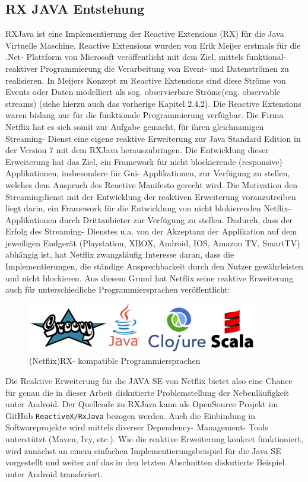 \documentclass[12pt,oneside,a4paper,bibtotoc,liststotoc]{scrreprt}
\begin{document}
\subsection{RX JAVA Entstehung}
RXJava ist eine Implementierung der Reactive Extensions (RX) für die Java Virtuelle Maschine. Reactive Extensions wurden von Erik Meijer erstmals für die .Net- Plattform von Microsoft veröffentlicht mit dem Ziel, mittels funktional-reaktiver Programmierung die Verarbeitung von Event- und Datenströmen zu realisieren. In Meijers Konzept zu Reactive Extensions sind diese Ströme von Events oder Daten modelliert als sog. \glqq observierbare Ströme\grqq (eng. observable streams) (siehe hierzu auch das vorherige Kapitel 2.4.2). Die Reactive Extensions waren bislang nur für die funktionale Programmierung verfügbar. Die Firma Netflix hat es sich somit zur Aufgabe gemacht, für ihren gleichnamigen Streaming- Dienst eine eigene reaktive Erweiterung zur Java Standard Edition in der Version 7 mit dem RXJava herauszubringen. Die Entwicklung dieser Erweiterung hat das Ziel, ein Framework für nicht blockierende (responsive) Applikationen, insbesondere für Gui- Applikationen, zur Verfügung zu stellen, welches dem Anspruch des Reactive Manifesto gerecht wird. Die Motivation den Streamingdienst mit der Entwicklung der reaktiven Erweiterung voranzutreiben liegt darin, ein Framework für die Entwicklung von nicht blokierenden Netflix- Applikationen durch Drittanbieter zur Verfügung zu stellen. Dadurch, dass der Erfolg des Streaming- Dienstes u.a. von der Akzeptanz der Applikation auf dem jeweiligen Endgerät (Playstation, XBOX, Android, IOS, Amazon TV, SmartTV) abhängig ist, hat Netflix zwangsläufig Interesse daran, dass die Implementierungen, die ständige Ansprechbarkeit durch den Nutzer gewährleisten und nicht blockieren. Aus diesem Grund hat Netflix seine reaktive Erweiterung auch für unterschiedliche Programmiersprachen veröffentlicht:
\begin{figure}[H]
  \begin{centering}
    \includegraphics[width=0.9\textwidth]{img/rx-languages.png}
    \caption{(Netflix)RX- kompatible Programmiersprachen}
    \label{rx-languages}
  \end{centering}
\end{figure} 
Die Reaktive Erweiterung für die JAVA SE von Netflix bietet also eine Chance für genau die in dieser Arbeit diskutierte Problemstellung der Nebenläufigkeit unter Android. Der Quellcode zu RXJava kann als OpenSource Projekt im GitHub \texttt{ReactiveX/RxJava} bezogen werden. Auch die Einbindung in Softwareprojekte wird mittels diverser Dependency- Management- Tools unterstützt (Maven, Ivy, etc.). Wie die reaktive Erweiterung konkret funktioniert, wird zunächst an einem einfachen Implementierungsbeispiel für die Java SE vorgestellt und weiter auf das in den letzten Abschnitten diskutierte Beispiel unter Android transferiert.
\end{document}
